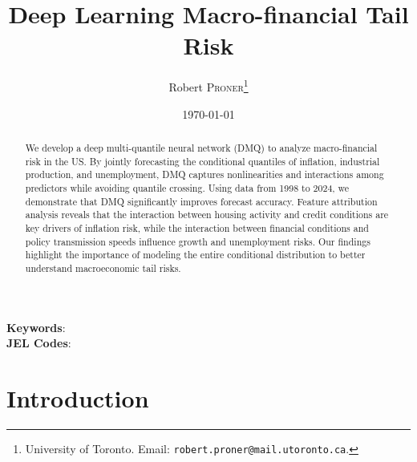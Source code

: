 \documentclass[12pt]{article}
\begin{document}
\title{{\bf \Large Deep Learning Macro-financial Tail Risk}
}


\author{Robert \textsc{Proner}\thanks{University of Toronto. Email: \texttt{robert.proner@mail.utoronto.ca}.}} 

\date{\today}
\maketitle
\begin{abstract}
\noindent 
We develop a deep multi-quantile neural network (DMQ) to analyze macro-financial risk in the US. By jointly forecasting the conditional quantiles of inflation, industrial production, and unemployment, DMQ captures nonlinearities and interactions among predictors while avoiding quantile crossing. Using data from 1998 to 2024, we demonstrate that DMQ significantly improves forecast accuracy. Feature attribution analysis reveals that the interaction between housing activity and credit conditions are key drivers of inflation risk, while the interaction between financial conditions and policy transmission speeds influence growth and unemployment risks. Our findings highlight the importance of modeling the entire conditional distribution to better understand macroeconomic tail risks.
\end{abstract}

\textbf{Keywords}: \\
\textbf{JEL Codes}: 


\section{Introduction}
\end{document}
